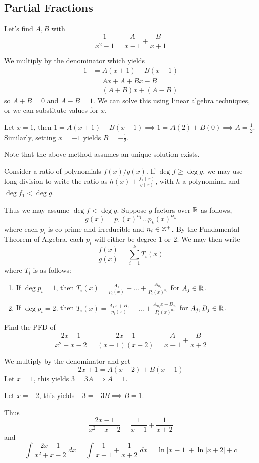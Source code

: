 \documentclass{article}
\begin{document}
\subsection{Partial Fractions}
\begin{remark}
  Let's find $A, B$ with \[
    \frac{1}{x^2-1} = \frac{A}{x-1} + \frac{B}{x+1}
  \]

  We multiply by the denominator which yields
  \begin{align*}
    1 &= A(x+1) + B(x-1)\\
    &= Ax + A + Bx - B\\
    &= (A + B)x + (A - B)
  \end{align*}
  so $A + B = 0$ and $A - B = 1$. We can solve this using linear algebra techniques, or we can substitute values for $x$.

  Let $x = 1$, then $1 = A(x+1) + B(x-1)\implies 1 = A(2) + B(0) \implies A = \frac{1}{2}$. Similarly, setting $x = -1$ yields $B = -\frac{1}{2}$.

  Note that the above method assumes an unique solution exists.
\end{remark}
\begin{cthm}
  Consider a ratio of polynomials $f(x)/g(x)$. If $\deg f \geq \deg g$, we may use long division to write the ratio as $h(x) +
  \frac{f_1(x)}{g(x)}$, with $h$ a polynominal and $\deg f_1 < \deg g$.

  Thus we may assume $\deg f < \deg g$. Suppose $g$ factors over $\mathbb{R}$ as follows,
  \[
    g(x) = p_1(x)^{n_1}\dots p_k(x)^{n_k}
  \] where each $p_i$ is co-prime and irreducible and $n_i \in \mathbb{Z}^+$. By the Fundamental Theorem of Algebra, each $p_i$ will either be degree $1$ or $2$. We may then write \[
    \frac{f(x)}{g(x)} = \sum_{i=1}^k T_i(x)
  \] where $T_i$ is as follows:

  \begin{enumerate}
    \item If $\deg p_i = 1$, then $T_i(x) = \frac{A_1}{p_i(x)} + \dots + \frac{A_{n_i}}{P_i(x)^{n_i}}$ for $A_j \in \mathbb{R}$.
    \item If $\deg p_i = 2$, then $T_i(x) = \frac{A_1x + B_1}{p_i(x)} + \dots + \frac{A_{n_i}x + B_{n_i}}{P_i(x)^{n_i}}$ for $A_j, B_j \in \mathbb{R}$.
  \end{enumerate}
\end{cthm}
\begin{example}
  Find the PFD of \[
    \frac{2x-1}{x^2 + x - 2} = \frac{2x-1}{(x-1)(x+2)} = \frac{A}{x-1} + \frac{B}{x+2}
  \]

  We multiply by the denominator and get \[
    2x + 1 = A(x+2) + B(x-1)
  \]
  Let $x = 1$, this yields $3 = 3A \implies A = 1$.

  Let $x = -2$, this yields $-3 = -3B \implies B = 1$.

  Thus \[
    \frac{2x-1}{x^2 + x - 2} = \frac{1}{x-1} + \frac{1}{x+2}
  \] and \[
    \int \frac{2x-1}{x^2 + x - 2} \; dx = \int \frac{1}{x-1} + \frac{1}{x+2}  \; dx = \ln |x-1| + \ln |x+2| + c
  \]
\end{example}
\end{document}

